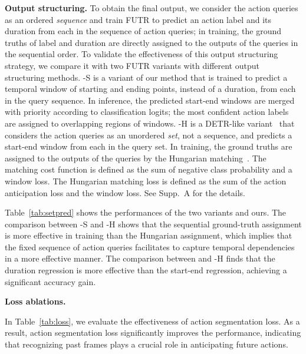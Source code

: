 
\noindent
\textbf{Output structuring.}
To obtain the final output, we consider the action queries as an ordered {\it sequence} and train FUTR to predict an action label and its duration from each in the sequence of action queries; in training, the ground truths of label and duration are directly assigned to the outputs of the queries in the sequential order.
To validate the effectiveness of this output structuring strategy, we compare it with two FUTR variants with different output structuring methods.
\ours-S is a variant of our method that is trained to predict a temporal window of starting and ending points, instead of a duration, from each in the query sequence. 
In inference, the predicted start-end windows are merged with priority according to classification logits; the most confident action labels are assigned to overlapping regions of windows. 
\ours-H is a DETR-like variant~\cite{carion2020end} that considers the action queries as an unordered {\it set}, not a sequence, and predicts a start-end window from each in the query set. In training, the ground truths are assigned to the outputs of the queries by the Hungarian matching~\cite{kuhn1955hungarian}. The matching cost function is defined as the sum of negative class probability and a window loss. 
The Hungarian matching loss is defined as the sum of the action anticipation loss and the window loss. 
See Supp.~A for the details.

Table~\ref{tab:setpred} shows the performances of the two variants and ours.  
The comparison between \ours-S and \ours-H shows that the sequential ground-truth assignment is more effective in training than the Hungarian assignment, which implies that the fixed sequence of action queries facilitates to capture temporal dependencies in a more effective manner. 
The comparison between \ours and \ours-H finds that the duration regression is more effective than the start-end regression, achieving a significant accuracy gain.

\vspace{1mm}

\noindent
\textbf{Loss ablations.}

In Table~\ref{tab:loss}, we evaluate the effectiveness of action segmentation loss. As a result, action segmentation loss significantly improves the performance, indicating that recognizing past frames plays a crucial role in anticipating future actions.




